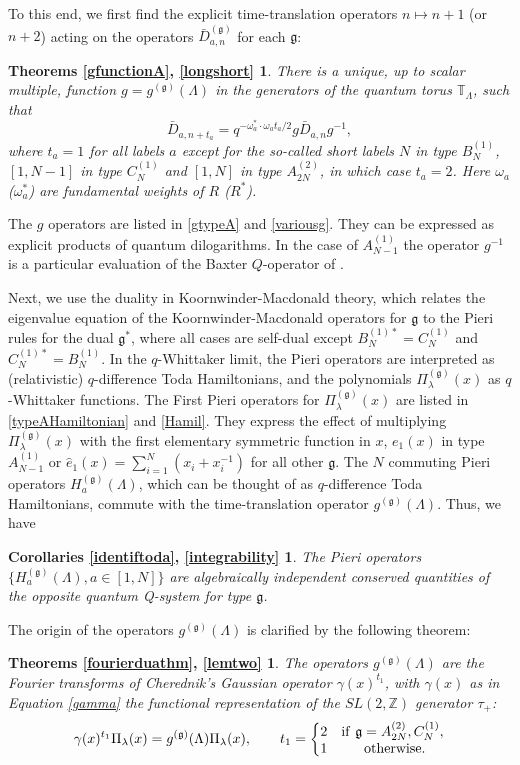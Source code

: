 \documentclass[12pt]{amsart}
\newcommand{\barD}{\bar D}
\newcommand{\g}{{\mathfrak{g}}}
\newcommand{\Z}{{\mathbb Z}}
\numberwithin{equation}{section}
\begin{document}
To this end, we first find the explicit time-translation operators $n\mapsto n+1$ (or $n+2$) acting on the operators $\barD_{a,n}^{(\g)}$ for each $\g$: 
\newtheorem*{goperators}{Theorems \ref{gfunctionA}, \ref{longshort}}
\begin{goperators}
There is a unique, up to scalar multiple, function $g=g^{(\g)}(\Lambda)$ in the generators of the quantum torus $\mathbb T_\Lambda$, such that
$$\barD_{a,n+t_a} = q^{-\omega_a^*\cdot \omega_a t_a/2} g \barD_{a,n} g^{-1},$$
where $t_a=1$ for all labels $a$ except for the so-called short labels $N$ in type $B_{N}^{(1)}$, $[1,N-1]$ in type $C_N^{(1)}$ and $[1,N]$ in type $A_{2N}^{(2)}$, in which case $t_a=2$. Here $\omega_a$ ($\omega_a^*$) are fundamental weights of $R$ ($R^*$).
\end{goperators}
The $g$ operators are listed in \eqref{gtypeA} and \eqref{variousg}. They can be expressed as explicit products of quantum dilogarithms. In the case of $A_{N-1}^{(1)}$ the  operator $g^{-1}$ is a particular evaluation of the Baxter $Q$-operator of \cite{SS}.
%

Next, we use the duality in Koornwinder-Macdonald theory, 
which relates the eigenvalue equation of the Koornwinder-Macdonald operators for $\g$ to the Pieri rules for the dual $\g^*$, 
where all cases are self-dual except $B_N^{(1)*}=C_N^{(1)}$ and $C_N^{(1)*}=B_N^{(1)}$. 
In the $q$-Whittaker limit, the Pieri operators are interpreted as (relativistic) $q$-difference Toda Hamiltonians, and the
polynomials $\Pi_\lambda^{(\g)}(x)$ as $q$-Whittaker functions. 
The First Pieri operators for $\Pi_\lambda^{(\g)}(x)$ are listed in \eqref{typeAHamiltonian} and \eqref{Hamil}. They express the effect of multiplying $\Pi_\lambda^{(\g)}(x)$ with the first elementary symmetric function in $x$, $e_1(x)$ in type $A_{N-1}^{(1)}$ or $\hat e_1(x)=\sum_{i=1}^N( x_i + x_i^{-1})$ for all other $\g$. The $N$ commuting Pieri operators $H_a^{(\g)}(\Lambda)$, which can be thought of as $q$-difference Toda Hamiltonians, commute with the time-translation operator $g^{(\g)}(\Lambda)$. Thus, we have 
%
%
%
\newtheorem*{integrability}{Corollaries \ref{identiftoda}, \ref{integrability}}
\begin{integrability}
The Pieri operators $\{H_a^{(\g)}(\Lambda), a\in[1,N]\}$ are algebraically independent conserved quantities of the opposite quantum Q-system for type $\g$.
\end{integrability}
The origin of the operators $g^{(\g)}(\Lambda)$ is clarified by the following theorem:
\newtheorem*{lemtwo}{Theorems \ref{fourierduathm}, \ref{lemtwo}}
\begin{lemtwo}
The operators $g^{(\g)}(\Lambda)$ are the Fourier transforms of Cherednik's Gaussian operator $\gamma(x)^{t_1}$, with $\gamma(x)$ as in Equation \eqref{gamma} the functional representation of the $SL(2,\Z)$ generator $\tau_+$:
$$
\gamma(x)^{t_1} \Pi_\lambda(x) = g^{(\g)}(\Lambda) \Pi_\lambda(x), \qquad t_1=\left\{ \begin{matrix} 2 &  {\rm if}\  \g=A_{2N}^{(2)}, C_N^{(1)},\\ 1 &\ {\rm otherwise .}
\end{matrix}\right.
$$
\end{lemtwo}
\end{document}
